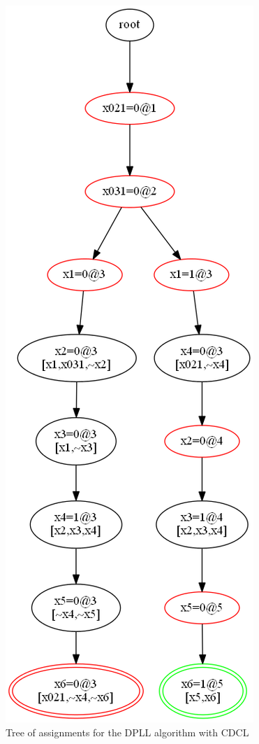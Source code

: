 \documentclass[11pt]{report}
\begin{document}
\begin{figure}
\begin{center}
\includegraphics[keepaspectratio=true,height=.9\textheight]{tree2-color}
\end{center}
\caption{Tree of assignments for the DPLL algorithm with CDCL}\label{tree2}
\end{figure}
\end{document}
